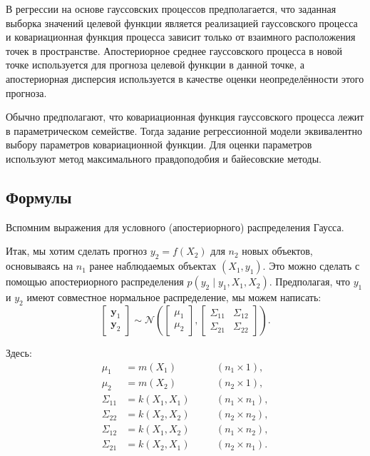 \documentclass[11pt,a4paper]{article}
\begin{document}
    В регрессии на основе гауссовских процессов предполагается, что заданная
выборка значений целевой функции является реализацией гауссовского
процесса и ковариационная функция процесса зависит только от взаимного
расположения точек в пространстве. Апостериорное среднее гауссовского
процесса в новой точке используется для прогноза целевой функции в
данной точке, а апостериорная дисперсия используется в качестве оценки
неопределённости этого прогноза.

Обычно предполагают, что ковариационная функция гауссовского процесса
лежит в параметрическом семействе. Тогда задание регрессионной модели
эквивалентно выбору параметров ковариационной функции. Для оценки
параметров используют метод максимального правдоподобия и байесовские
методы.

    \hypertarget{ux444ux43eux440ux43cux443ux43bux44b}{%
\subsection{Формулы}\label{ux444ux43eux440ux43cux443ux43bux44b}}

Вспомним выражения для условного (апостериорного) распределения Гаусса.

Итак, мы хотим сделать прогноз \(y_2 = f(X_2)\) для \(n_2\) новых
объектов, основываясь на \(n_1\) ранее наблюдаемых объектах
\((X_1,y_1)\). Это можно сделать с помощью апостериорного распределения
\(p(y_2 \mid y_1, X_1, X_2)\). Предполагая, что \(y_1\) и \(y_2\) имеют
совместное нормальное распределение, мы можем написать:
\[
\left[\begin{array}{c} \mathbf{y}_{1} \\ \mathbf{y}_{2} \end{array}\right]
\sim
\mathcal{N} \left(
\left[\begin{array}{c} \mu_{1} \\ \mu_{2} \end{array}\right],
\left[ \begin{array}{cc}
\Sigma_{11} & \Sigma_{12} \\
\Sigma_{21} & \Sigma_{22}
\end{array} \right]
\right).
\]

Здесь: \[
\begin{aligned}
    \mu_{1}     &= m(X_1)     \quad && (n_1 \times 1),   \\
    \mu_{2}     &= m(X_2)     \quad && (n_2 \times 1),   \\
    \Sigma_{11} &= k(X_1,X_1) \quad && (n_1 \times n_1), \\
    \Sigma_{22} &= k(X_2,X_2) \quad && (n_2 \times n_2), \\
    \Sigma_{12} &= k(X_1,X_2) \quad && (n_1 \times n_2), \\
    \Sigma_{21} &= k(X_2,X_1) \quad && (n_2 \times n_1).
\end{aligned}
\]
\end{document}
